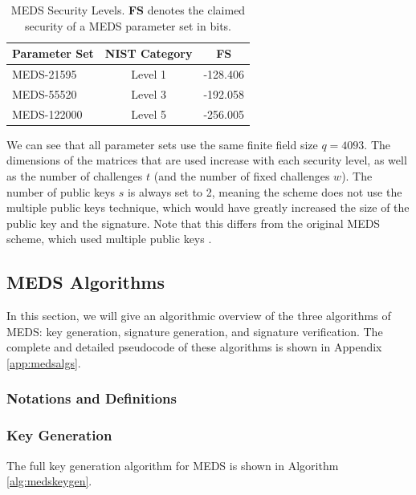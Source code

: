 \documentclass[11pt,a4paper]{report}
\theoremstyle{definition}
\begin{document}
\begin{table}
  \centering
  \begin{tabular}{lcc}
    \toprule
    \textbf{Parameter Set} & \textbf{NIST Category} & \textbf{FS} \\
    \midrule
    MEDS-21595 & Level 1 & -128.406 \\
    MEDS-55520 & Level 3 & -192.058 \\
    MEDS-122000 & Level 5 & -256.005 \\
    \bottomrule
  \end{tabular}
  \caption{MEDS Security Levels. \textbf{FS} denotes the claimed security of a MEDS parameter set in bits.}
  \label{tab:medssecuritylevels}
\end{table}

We can see that all parameter sets use the same finite field size $q = 4093$. The dimensions of the matrices that are used increase with each security level, as well as the number of challenges $t$ (and the number of fixed challenges $w$). The number of public keys $s$ is always set to 2, meaning the scheme does not use the multiple public keys technique, which would have greatly increased the size of the public key and the signature. Note that this differs from the original MEDS scheme, which used multiple public keys \cite{chou2023meds}.

\subsection{MEDS Algorithms}
\label{sec:medsalgorithms}
In this section, we will give an algorithmic overview of the three algorithms of MEDS: key generation, signature generation, and signature verification. The complete and detailed pseudocode of these algorithms is shown in Appendix \ref{app:medsalgs}.

\subsubsection{Notations and Definitions}

\subsubsection{Key Generation}
The full key generation algorithm for MEDS is shown in Algorithm \ref{alg:medskeygen}.
\end{document}

